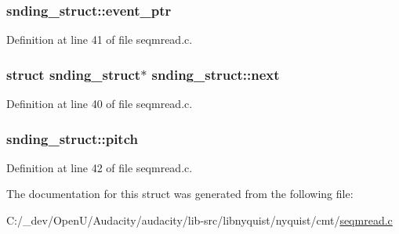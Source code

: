 \subsubsection[{\texorpdfstring{event\+\_\+ptr}{event_ptr}}]{ snding\+\_\+struct\+::event\+\_\+ptr}\hypertarget{structsnding__struct_adbda1f2f4650fa868ded9b87274a318b}{}\label{structsnding__struct_adbda1f2f4650fa868ded9b87274a318b}


Definition at line 41 of file seqmread.\+c.

\subsubsection[{\texorpdfstring{next}{next}}]{\setlength{\rightskip}{0pt plus 5cm}struct {\bf snding\+\_\+struct}$\ast$ snding\+\_\+struct\+::next}\hypertarget{structsnding__struct_aa6d1cd097acaaf897cc29a91ca7ed1f6}{}\label{structsnding__struct_aa6d1cd097acaaf897cc29a91ca7ed1f6}


Definition at line 40 of file seqmread.\+c.

\subsubsection[{\texorpdfstring{pitch}{pitch}}]{ snding\+\_\+struct\+::pitch}\hypertarget{structsnding__struct_ad79ba9d14950ea9fac3cd9e47f86ff7c}{}\label{structsnding__struct_ad79ba9d14950ea9fac3cd9e47f86ff7c}


Definition at line 42 of file seqmread.\+c.



The documentation for this struct was generated from the following file\+:\begin{DoxyCompactItemize}
\item 
C\+:/\+\_\+dev/\+Open\+U/\+Audacity/audacity/lib-\/src/libnyquist/nyquist/cmt/\hyperlink{seqmread_8c}{seqmread.\+c}\end{DoxyCompactItemize}
